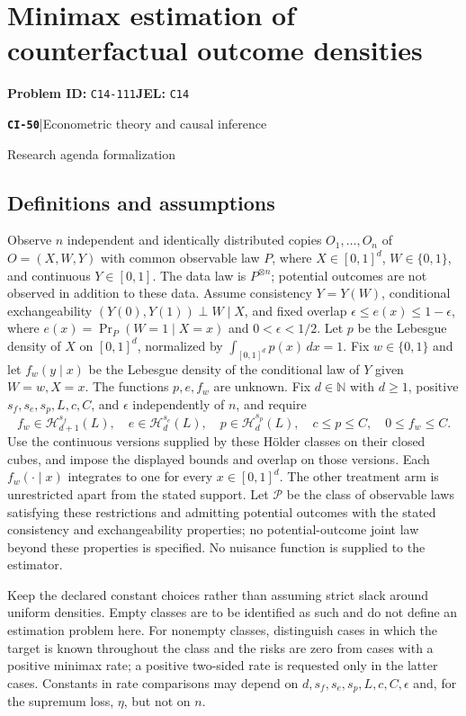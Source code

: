 \documentclass[11pt,a4paper]{article}
\newcommand{\N}{\mathbb N}
\newcommand{\entrymeta}[3]{{\sffamily\small\color{muted}\textbf{\texttt{#1}}\quad|\quad #2\par #3\par}}
\begin{document}
\section*{Minimax estimation of counterfactual outcome densities}
\textbf{Problem ID:} \texttt{C14-111}\quad \textbf{JEL:} \texttt{C14}\par
\label{problem:OP-0529}
\label{beyond:CI-50}
\entrymeta{CI-50}{Econometric theory and causal inference}{Research agenda formalization}
\subsection*{Definitions and assumptions}
Observe $n$ independent and identically distributed copies $O_1,\ldots,O_n$ of $O=(X,W,Y)$ with common observable law $P$, where $X\in[0,1]^d$, $W\in\{0,1\}$, and continuous $Y\in[0,1]$. The data law is $P^{\otimes n}$; potential outcomes are not observed in addition to these data. Assume consistency $Y=Y(W)$, conditional exchangeability $(Y(0),Y(1))\perp W\mid X$, and fixed overlap $\epsilon\leq e(x)\leq1-\epsilon$, where $e(x)=\Pr_P(W=1\mid X=x)$ and $0<\epsilon<1/2$. Let $p$ be the Lebesgue density of $X$ on $[0,1]^d$, normalized by $\int_{[0,1]^d}p(x)\,dx=1$. Fix $w\in\{0,1\}$ and let $f_w(y\mid x)$ be the Lebesgue density of the conditional law of $Y$ given $W=w,X=x$. The functions $p,e,f_w$ are unknown. Fix $d\in\N$ with $d\geq1$, positive $s_f,s_e,s_p,L,c,C$, and $\epsilon$ independently of $n$, and require
\[
 f_w\in\mathcal H_{d+1}^{s_f}(L),\quad
 e\in\mathcal H_d^{s_e}(L),\quad
 p\in\mathcal H_d^{s_p}(L),\quad
 c\leq p\leq C,\quad 0\leq f_w\leq C.
\]
Use the continuous versions supplied by these H\"older classes on their closed cubes, and impose the displayed bounds and overlap on those versions. Each $f_w(\cdot\mid x)$ integrates to one for every $x\in[0,1]^d$. The other treatment arm is unrestricted apart from the stated support. Let $\mathcal P$ be the class of observable laws satisfying these restrictions and admitting potential outcomes with the stated consistency and exchangeability properties; no potential-outcome joint law beyond these properties is specified. No nuisance function is supplied to the estimator.

Keep the declared constant choices rather than assuming strict slack around uniform densities. Empty classes are to be identified as such and do not define an estimation problem here. For nonempty classes, distinguish cases in which the target is known throughout the class and the risks are zero from cases with a positive minimax rate; a positive two-sided rate is requested only in the latter cases. Constants in rate comparisons may depend on $d,s_f,s_e,s_p,L,c,C,\epsilon$ and, for the supremum loss, $\eta$, but not on $n$.
\end{document}
